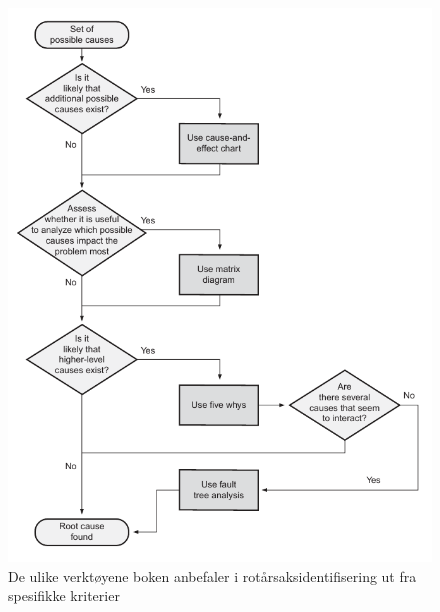 \begin{figure}[H]
    \centering
    \includegraphics[scale=0.65]{main/bilder/verktoyvalg/verktoyvalg_rotarsaksidentifisering.pdf}
    \caption[Verktøyvalg for rotårsaksidentifisering]{De ulike verktøyene boken anbefaler i rotårsaksidentifisering ut fra spesifikke kriterier}
    \label{fig:verktoyvalg-rotarsaksidentifisering}
\end{figure}

